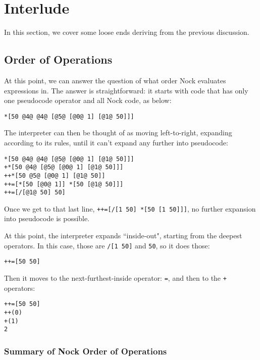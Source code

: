 \documentclass[twoside]{article}
\begin{document}
\section{Interlude}

In this section, we cover some loose ends deriving from the previous discussion.

\subsection{Order of Operations}

At this point, we can answer the question of what order Nock evaluates expressions in.  The answer is straightforward: it starts with code that has only one pseudocode operator and all Nock code, as below:

\begin{lstlisting}[style=listingcode]
*[50 @4@ @4@ [@5@ [@0@ 1] [@1@ 50]]]
\end{lstlisting}

\noindent{}
The interpreter can then be thought of as moving left-to-right, expanding according to its rules, until it can't expand any further into pseudocode:

\begin{lstlisting}[style=listingcode]
*[50 @4@ @4@ [@5@ [@0@ 1] [@1@ 50]]]
+*[50 @4@ [@5@ [@0@ 1] [@1@ 50]]]
++*[50 @5@ [@0@ 1] [@1@ 50]]
++=[*[50 [@0@ 1]] *[50 [@1@ 50]]]
++=[/[@1@ 50] 50]
\end{lstlisting}

\noindent{}
Once we get to that last line, \lstinline[style=inlinecode]{++=[/[1 50] *[50 [1 50]]]}, no further expansion into pseudocode is possible.

At this point, the interpreter expands ``inside-out", starting from the deepest operators. In this case, those are \lstinline[style=inlinecode]{/[1 50]} and \lstinline[style=inlinecode]{50}, so it does those:

\begin{lstlisting}[style=listingcode]
++=[50 50]
\end{lstlisting}

\noindent{}
Then it moves to the next-furthest-inside operator: \lstinline[style=inlinecode]{=}, and then to the \lstinline[style=inlinecode]{+} operators:

\begin{lstlisting}[style=listingcode]
++=[50 50]
++(0)
+(1)
2
\end{lstlisting}

\subsubsection{Summary of Nock Order of Operations}
\end{document}
